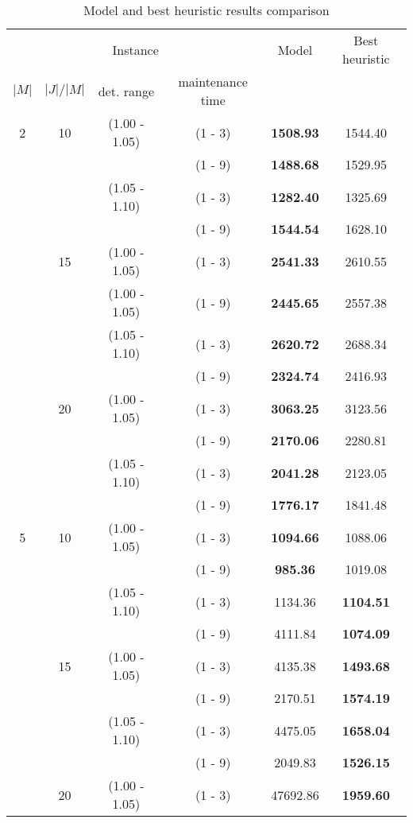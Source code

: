 \documentclass[a4paper,11pt]{article}
\begin{document}
\begin{table}[!ht]
\caption{Model and best heuristic results comparison}
\tiny
\centering
\begin{tabular}{|c|c|c|c|c|c|}
\hline

\multicolumn{4}{|c|}{Instance} & Model  & Best heuristic  \\

$|M|$ & $|J|/|M|$ & det. range & maintenance time & & \\
\hline

2 & 10 & (1.00 - 1.05) & (1 - 3) & \textbf{1508.93} & 1544.40 \\
  &    &  & (1 - 9) & \textbf{1488.68} & 1529.95 \\
  &    & (1.05 - 1.10) & (1 - 3) & \textbf{1282.40} & 1325.69 \\
  &    &  & (1 - 9) & \textbf{1544.54} & 1628.10 \\
  & 15 & (1.00 - 1.05) & (1 - 3) & \textbf{2541.33} & 2610.55 \\
  &    & (1.00 - 1.05) & (1 - 9) & \textbf{2445.65} & 2557.38 \\
  &    & (1.05 - 1.10) & (1 - 3) &  \textbf{2620.72} & 2688.34 \\ 
  &    &  & (1 - 9) & \textbf{2324.74} & 2416.93 \\ 
  & 20 & (1.00 - 1.05) & (1 - 3) & \textbf{3063.25} & 3123.56 \\
  &    &  & (1 - 9) & \textbf{2170.06} & 2280.81 \\
  &    & (1.05 - 1.10) & (1 - 3) & \textbf{2041.28} & 2123.05 \\
  &    &  & (1 - 9) & \textbf{1776.17} & 1841.48 \\
5  & 10 & (1.00 - 1.05) & (1 - 3) & \textbf{1094.66} & 1088.06 \\
   &    &  & (1 - 9) & \textbf{985.36} & 1019.08 \\
   &    & (1.05 - 1.10) & (1 - 3) & 1134.36 & \textbf{1104.51} \\
   &    &  & (1 - 9) & 4111.84 & \textbf{1074.09} \\
   & 15 & (1.00 - 1.05) & (1 - 3) & 4135.38 & \textbf{1493.68} \\
   &    &  & (1 - 9) & 2170.51 & \textbf{1574.19} \\
   &    & (1.05 - 1.10) & (1 - 3) & 4475.05 & \textbf{1658.04} \\
   &    &  & (1 - 9) & 2049.83 & \textbf{1526.15} \\
   & 20 & (1.00 - 1.05) & (1 - 3) & 47692.86 & \textbf{1959.60} \\

\end{tabular}
\end{table}
\end{document}
